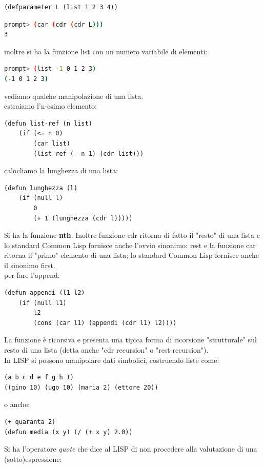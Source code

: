 \documentclass[a4paper,12pt, oneside]{book}
\begin{document}
\begin{verbatim}
(defparameter L (list 1 2 3 4))
\end{verbatim}
\begin{shaded}
\begin{lstlisting}[language=bash]
prompt> (car (cdr (cdr L)))
3
\end{lstlisting}
\end{shaded}
inoltre si ha la funzione list con un numero variabile di elementi:
\begin{shaded}
\begin{lstlisting}[language=bash]
prompt> (list -1 0 1 2 3)
(-1 0 1 2 3)
\end{lstlisting}
\end{shaded}
vediamo qualche manipolazione di una lista.\\
estraiamo l'n-esimo elemento:
\begin{verbatim}
(defun list-ref (n list)
    (if (<= n 0)
        (car list)
        (list-ref (- n 1) (cdr list)))
\end{verbatim}
calocliamo la lunghezza di una lista:
\begin{verbatim}
(defun lunghezza (l)
    (if (null l)
        0
        (+ 1 (lunghezza (cdr l)))))
\end{verbatim}
Si ha la funzione \textbf{nth}. Inoltre funzione cdr ritorna di fatto il "resto" di una lista e lo standard
Common Lisp fornisce anche l'ovvio sinonimo: rest e la funzione car ritorna il "primo" elemento di una lista; lo standard
Common Lisp fornisce anche il sinonimo first.\\
per fare l'append:
\begin{verbatim}
(defun appendi (l1 l2)
    (if (null l1)
        l2
        (cons (car l1) (appendi (cdr l1) l2))))
\end{verbatim}
La funzione è ricorsiva e presenta una tipica forma di ricorsione "strutturale" sul resto di una lista (detta anche "cdr recursion" o "rest-recursion").\\
In LISP si possono manipolare dati simbolici, costruendo liste come:
\begin{verbatim}
(a b c d e f g h I)
((gino 10) (ugo 10) (maria 2) (ettore 20))
\end{verbatim}
o anche:
\begin{verbatim}
(+ quaranta 2)
(defun media (x y) (/ (+ x y) 2.0))
\end{verbatim}
Si ha l'operatore \textit{quote} che dice al LISP di non procedere alla valutazione di una (sotto)espressione:
\end{document}
